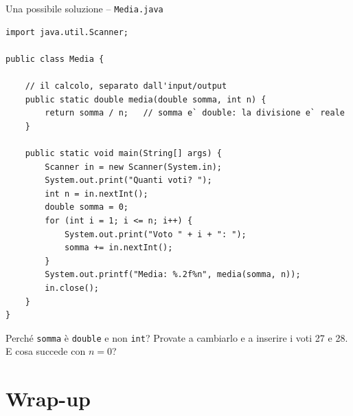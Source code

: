 \documentclass[10pt,aspectratio=169]{beamer}
\begin{document}
\begin{frame}[fragile]{Una possibile soluzione -- \texttt{Media.java}}
\begin{lstlisting}[basicstyle=\ttfamily\scriptsize]
import java.util.Scanner;

public class Media {

    // il calcolo, separato dall'input/output
    public static double media(double somma, int n) {
        return somma / n;   // somma e` double: la divisione e` reale
    }

    public static void main(String[] args) {
        Scanner in = new Scanner(System.in);
        System.out.print("Quanti voti? ");
        int n = in.nextInt();
        double somma = 0;
        for (int i = 1; i <= n; i++) {
            System.out.print("Voto " + i + ": ");
            somma += in.nextInt();
        }
        System.out.printf("Media: %.2f%n", media(somma, n));
        in.close();
    }
}
\end{lstlisting}
\vspace{-0.2cm}\small Perché \texttt{somma} è \texttt{double} e non \texttt{int}? Provate a cambiarlo e a inserire i voti 27 e 28. E cosa succede con $n = 0$?
\end{frame}

\section{Wrap-up}
\end{document}
